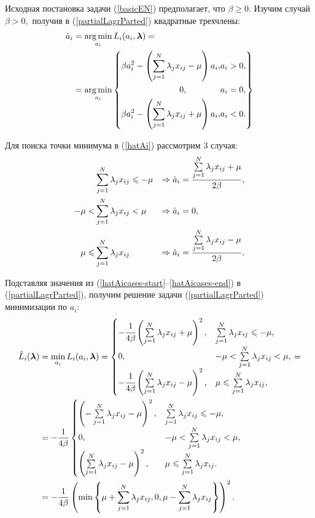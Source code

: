 Исходная постановка задачи (\ref{basicEN}) предполагает, что $\beta\ge0.$ Изучим случай $\beta > 0,$ получив в (\ref{partialLagrParted}) квадратные трехчлены:
\begin{equation}
	\label{hatAi}
	\begin{split}
		\hat a_i &= \mathop{\mbox{arg\ \!min}}\limits_{a_i} L_i(a_i,\boldsymbol{\mathbf{\lambda}}) = \\
				 &=	\mathop{\mbox{arg\ \!min}}\limits_{a_i} \left\{
				 	\begin{aligned}
						\beta a_i^2 - \left(\sum\limits_{j=1}^N\lambda_jx_{ij}-\mu\right)a_i, &a_i > 0,\\
						0, \qquad\qquad &a_i = 0,\\
						\beta a_i^2 - \left(\sum\limits_{j=1}^N\lambda_jx_{ij}+\mu\right)a_i, &a_i < 0.\\
					\end{aligned}	
					\right\}
	\end{split}
\end{equation}

Для поиска точки минимума в (\ref{hatAi}) рассмотрим 3 случая:
\begin{align}
	\label{hatAicases-start}
	         &\sum\limits_{j=1}^N\lambda_jx_{ij} \leqslant -\mu 	&\Rightarrow \hat a_i &= \frac{\sum\limits_{j=1}^N\lambda_jx_{ij}+\mu}{2\beta}, \\
	-\mu <   &\sum\limits_{j=1}^N\lambda_jx_{ij} < \mu 	&\Rightarrow \hat a_i &= 0, \\
	\label{hatAicases-end}
	\mu \leqslant &\sum\limits_{j=1}^N\lambda_jx_{ij} 			&\Rightarrow \hat a_i &= \frac{\sum\limits_{j=1}^N\lambda_jx_{ij}-\mu}{2\beta}.
\end{align}


Подставляя значения из (\ref{hatAicases-start}--\ref{hatAicases-end}) в (\ref{partialLagrParted}), получим решение задачи (\ref{partialLagrParted}) минимизации по $a_i$:
\begin{align}
	\label{hatLiSquared}
	\begin{split}
		\hat L_i(\boldsymbol{\mathbf{\lambda}}) &= \mathop{\mbox{min}}\limits_{a_i}L_i(a_i, \boldsymbol{\mathbf{\lambda}}) =
		\begin{cases}
			-\cfrac1{4\beta}\left(\sum\limits_{j=1}^N\lambda_jx_{ij}+\mu\right)^2, &\sum\limits_{j=1}^N\lambda_jx_{ij} \leqslant -\mu,\\
			0, 										&-\mu < \sum\limits_{j=1}^N\lambda_jx_{ij} < \mu,\\
			-\cfrac1{4\beta}\left(\sum\limits_{j=1}^N\lambda_jx_{ij}-\mu\right)^2, &\mu\leqslant\sum\limits_{j=1}^N\lambda_jx_{ij},
		\end{cases} = \\
		&= -\frac1{4\beta}
		\begin{cases}
			\left(-\sum\limits_{j=1}^N\lambda_jx_{ij}-\mu\right)^2, &\sum\limits_{j=1}^N\lambda_jx_{ij} \leqslant -\mu,\\
			0, 	 					&-\mu < \sum\limits_{j=1}^N\lambda_jx_{ij} < \mu,\\
			\left(\sum\limits_{j=1}^N\lambda_jx_{ij}-\mu\right)^2, &\mu\leqslant\sum\limits_{j=1}^N\lambda_jx_{ij}.
		\end{cases} 	\\
		&= -\frac1{4\beta} \left(\mathop{\mbox{min}}\limits\left\{\mu + \sum\limits_{j=1}^N\lambda_jx_{ij}, 0, \mu-\sum\limits_{j=1}^N\lambda_jx_{ij}\right\}\right)^2.
	\end{split}
\end{align}

